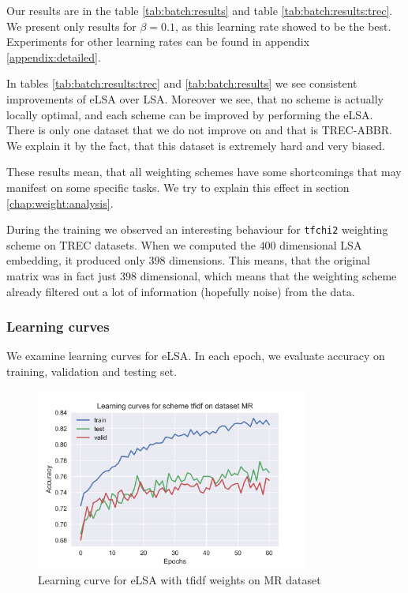     Our results are in the table \ref{tab:batch:results} and table \ref{tab:batch:results:trec}.
    We present only results for $\beta=0.1$, as this learning rate showed to be the best. 
    Experiments for other learning rates can be found in appendix \ref{appendix:detailed}.
    
    

    In tables \ref{tab:batch:results:trec} and \ref{tab:batch:results} we see consistent improvements of eLSA over LSA.
    Moreover we see, that no scheme is actually locally optimal, and each scheme can be improved by performing the eLSA.
    There is only one dataset that we do not improve on and that is TREC-ABBR.
    We explain it by the fact, that this dataset is extremely hard and very biased. 
    
    These results mean, that all weighting schemes have some shortcomings 
    that may manifest on some specific tasks.  
    We try to explain this effect in section \ref{chap:weight:analysis}.
    
    During the training we observed an interesting behaviour for \texttt{tfchi2} weighting scheme on TREC datasets.
    When we computed the $400$ dimensional LSA embedding, it produced only $398$ dimensions. 
    This means, that the original matrix was in fact just $398$ dimensional, 
    which means that the weighting scheme already filtered out a lot of information (hopefully noise) from the data. 

    \subsubsection{Learning curves}
    We examine learning curves for eLSA.
    In each epoch, we evaluate accuracy on training, validation and testing set.
    
    \begin{figure}
    \centerline{\includegraphics[width=0.8\textwidth]{images/learning_curve_MR_tfidf}}
    \caption[Learning curve for eLSA with tfidf weights on MR dataset]{Learning curve for eLSA with tfidf weights on MR dataset}
    \label{img:learning:curve}
    \end{figure}

